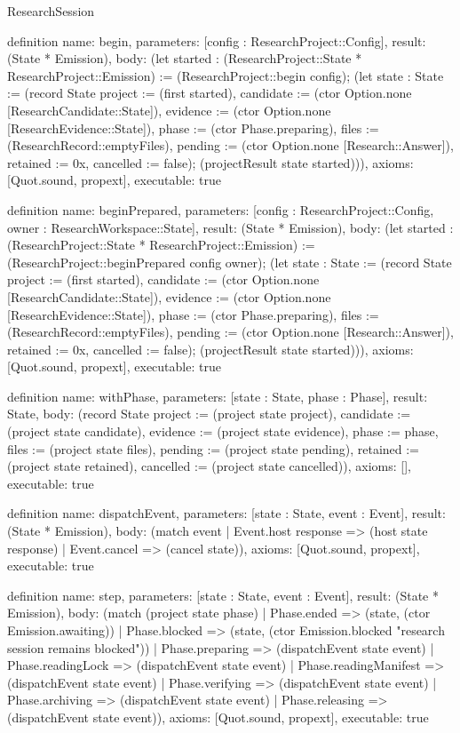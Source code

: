 \begin{lexlean}{ResearchSession}
\begin{semanticmodule}
definition{
 name: begin,
 parameters: [config : ResearchProject::Config],
 result: (State * Emission),
 body: (let started : (ResearchProject::State * ResearchProject::Emission) := (ResearchProject::begin config); (let state : State := (record State {project := (first started), candidate := (ctor Option.none [ResearchCandidate::State]), evidence := (ctor Option.none [ResearchEvidence::State]), phase := (ctor Phase.preparing), files := (ResearchRecord::emptyFiles), pending := (ctor Option.none [Research::Answer]), retained := 0x, cancelled := false}); (projectResult state started))),
 axioms: [Quot.sound, propext],
 executable: true
}

definition{
 name: beginPrepared,
 parameters: [config : ResearchProject::Config, owner : ResearchWorkspace::State],
 result: (State * Emission),
 body: (let started : (ResearchProject::State * ResearchProject::Emission) := (ResearchProject::beginPrepared config owner); (let state : State := (record State {project := (first started), candidate := (ctor Option.none [ResearchCandidate::State]), evidence := (ctor Option.none [ResearchEvidence::State]), phase := (ctor Phase.preparing), files := (ResearchRecord::emptyFiles), pending := (ctor Option.none [Research::Answer]), retained := 0x, cancelled := false}); (projectResult state started))),
 axioms: [Quot.sound, propext],
 executable: true
}

definition{
 name: withPhase,
 parameters: [state : State, phase : Phase],
 result: State,
 body: (record State {project := (project state project), candidate := (project state candidate), evidence := (project state evidence), phase := phase, files := (project state files), pending := (project state pending), retained := (project state retained), cancelled := (project state cancelled)}),
 axioms: [],
 executable: true
}

definition{
 name: dispatchEvent,
 parameters: [state : State, event : Event],
 result: (State * Emission),
 body: (match event | Event.host response => (host state response) | Event.cancel => (cancel state)),
 axioms: [Quot.sound, propext],
 executable: true
}

definition{
 name: step,
 parameters: [state : State, event : Event],
 result: (State * Emission),
 body: (match (project state phase) | Phase.ended => (state, (ctor Emission.awaiting)) | Phase.blocked => (state, (ctor Emission.blocked "research session remains blocked")) | Phase.preparing => (dispatchEvent state event) | Phase.readingLock => (dispatchEvent state event) | Phase.readingManifest => (dispatchEvent state event) | Phase.verifying => (dispatchEvent state event) | Phase.archiving => (dispatchEvent state event) | Phase.releasing => (dispatchEvent state event)),
 axioms: [Quot.sound, propext],
 executable: true
}


\end{semanticmodule}
\end{lexlean}

